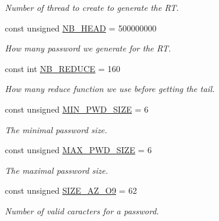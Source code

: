 \begin{DoxyCompactItemize}
\begin{DoxyCompactList}\small\item\em Number of thread to create to generate the RT. \end{DoxyCompactList}\item 
const unsigned \hyperlink{namespacebe_1_1esi_1_1secl_1_1pn_a3f7aaccb1bf4e47f92d72bf9b2471328}{N\+B\+\_\+\+H\+E\+AD} = 500000000
\begin{DoxyCompactList}\small\item\em How many password we generate for the RT. \end{DoxyCompactList}\item 
const int \hyperlink{namespacebe_1_1esi_1_1secl_1_1pn_a9434f9e96778e243fcb677633df38598}{N\+B\+\_\+\+R\+E\+D\+U\+CE} = 160
\begin{DoxyCompactList}\small\item\em How many reduce function we use before getting the tail. \end{DoxyCompactList}\item 
const unsigned \hyperlink{namespacebe_1_1esi_1_1secl_1_1pn_ac4d6305d2a5baed196042f8a30533620}{M\+I\+N\+\_\+\+P\+W\+D\+\_\+\+S\+I\+ZE} = 6
\begin{DoxyCompactList}\small\item\em The minimal password size. \end{DoxyCompactList}\item 
const unsigned \hyperlink{namespacebe_1_1esi_1_1secl_1_1pn_a2e3241ac36dabdb668b68028e097dded}{M\+A\+X\+\_\+\+P\+W\+D\+\_\+\+S\+I\+ZE} = 6
\begin{DoxyCompactList}\small\item\em The maximal password size. \end{DoxyCompactList}\item 
const unsigned \hyperlink{namespacebe_1_1esi_1_1secl_1_1pn_a1ec87af9e9dbcae67e1e5974e7b96dde}{S\+I\+Z\+E\+\_\+\+A\+Z\+\_\+\+O9} = 62
\begin{DoxyCompactList}\small\item\em Number of valid caracters for a password. \end{DoxyCompactList}\item 

\end{DoxyCompactItemize}

